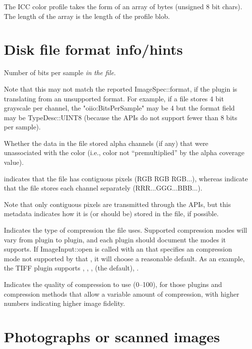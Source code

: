 The ICC color profile takes the form of an array of bytes (unsigned 8 bit
chars). The length of the array is the length of the profile blob.
\apiend


\section{Disk file format info/hints}

Number of bits per sample \emph{in the file}.  

Note that this may not match the reported {\cf ImageSpec::format}, if
the plugin is translating from an unsupported format.  For example, if a
file stores 4 bit grayscale per channel, the {\cf "oiio:BitsPerSample"} may
be 4 but the {\cf format} field may be {\cf TypeDesc::UINT8} (because
the \product APIs do not support fewer than 8 bits per sample).
\apiend

Whether the data in the file stored alpha channels (if any) that were
unassociated with the color (i.e., color not ``premultiplied'' by the
alpha coverage value).
\apiend

 indicates that the file has contiguous pixels (RGB RGB
RGB...), whereas  indicate that the file stores each
channel separately (RRR...GGG...BBB...).

Note that only contiguous pixels are transmitted through the \product
APIs, but this metadata indicates how it is (or should be) stored in the
file, if possible.
\apiend

Indicates the type of compression the file uses.  Supported compression
modes will vary from \ImageInput plugin to plugin, and each plugin
should document the modes it supports.  If {\cf ImageInput::open} is
called with an \ImageSpec that specifies an compression mode not
supported by that \ImageInput, it will choose a reasonable default.
As an example, the TIFF \ImageInput plugin supports ,
, ,  (the default), .
\apiend

Indicates the quality of compression to use (0--100), for those 
plugins and compression methods that allow a variable amount of 
compression, with higher numbers indicating higher image fidelity.
\apiend

\section{Photographs or scanned images}

